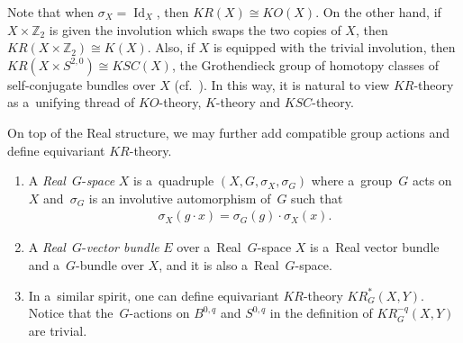 \documentclass[pdftex]{sigma}
\numberwithin{equation}{section}
\DeclareMathOperator{\Id}{Id}
\begin{document}
Note that when $\sigma_X=\Id_X$, then $KR(X)\cong KO(X)$.
On the other hand, if $X\times \mathbb{Z}_2$ is given the involution which swaps the two copies of $X$, then
$KR(X\times\mathbb{Z}_2)\cong K(X)$.
Also, if $X$ is equipped with the trivial involution, then $KR(X\times S^{2,0})\cong KSC(X)$, the Grothendieck group of
homotopy classes of self-conjugate bundles over $X$ (cf.~\cite{At3}).
In this way, it is natural to view $KR$-theory as a~unifying thread of $KO$-theory, $K$-theory and $KSC$-theory.

On top of the Real structure, we may further add compatible group actions and def\/ine equivariant $KR$-theory.
\begin{Definition}\label{eqkrtheory}\quad
\begin{enumerate}\itemsep=0pt
\item
A \emph{Real}~$G$-\emph{space} $X$ is a~quadruple $(X, G,
\sigma_X, \sigma_G)$ where a~group~$G$ acts on~$X$ and~$\sigma_G$ is an involutive automorphism of~$G$ such that
\begin{gather*}
\sigma_X(g\cdot x)=\sigma_G(g)\cdot\sigma_X(x).
\end{gather*}
\item
A \emph{Real}~$G$-\emph{vector bundle} $E$ over a~Real~$G$-space $X$ is a~Real vector bundle and a~$G$-bundle over $X$,
and it is also a~Real~$G$-space.
\item
In a~similar spirit, one can def\/ine equivariant $KR$-theory $KR_G^*(X, Y)$.
Notice that the~$G$-actions on $B^{0,q}$ and $S^{0,q}$ in the def\/inition of $KR_G^{-q}(X, Y)$ are trivial.
\end{enumerate}
\end{Definition}
\end{document}
